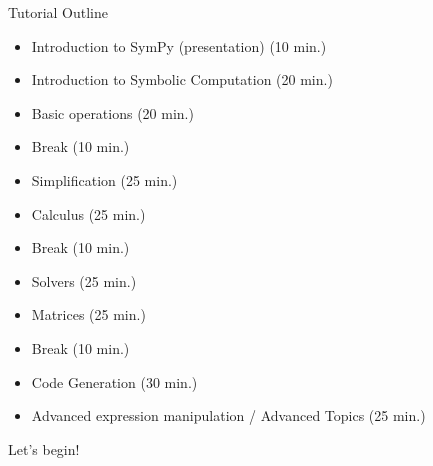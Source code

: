 \documentclass[xcolor=svgnames]{beamer}
\begin{document}
\begin{frame}{Tutorial Outline}
  \begin{block}{}
    \begin{itemize}
\item Introduction to SymPy (presentation) (10 min.)

\item Introduction to Symbolic Computation (20 min.)

\item Basic operations (20 min.)

\item Break (10 min.)

\item Simplification (25 min.)

\item Calculus (25 min.)

\item Break (10 min.)

\item Solvers (25 min.)

\item Matrices (25 min.)

\item Break (10 min.)

\item Code Generation (30 min.)

\item Advanced expression manipulation / Advanced Topics (25 min.)
    \end{itemize}
  \end{block}
\end{frame}

\begin{frame}
\Huge Let's begin!
\end{frame}
\end{document}
